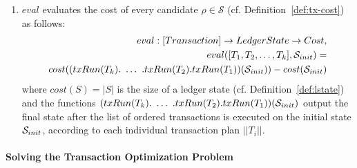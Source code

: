 \begin{definition}
\begin{enumerate}
        \item $eval$ evaluates the cost of every candidate $\rho \in
            \mathcal{S}$ (cf. Definition~\ref{def:tx-cost}) as follows:
            \begin{align*}
                eval : [Transaction] \rightarrow LedgerState \rightarrow Cost,
                \\
                eval([T_1, T_2, \dots, T_k], \ledgerState_{init}) = \\
                cost((txRun(T_k).\ \dots\ .txRun(T_2).txRun(T_1))(\ledgerState_{init})) - cost(\ledgerState_{init})\\
            \end{align*}
            where $cost(S) = |S|$ is the size of a ledger state (cf.
            Definition~\ref{def:lstate}) and the functions $(txRun(T_k).\ \dots\
            .txRun(T_2).txRun(T_1))(\mathcal{S}_{init})$ output the final
            state after the list of ordered transactions is executed on the
            initial state $\mathcal{S}_{init}$, according to each individual
            transaction plan $||T_i||$.
    \end{enumerate}
\end{definition}

\paragraph{Solving the Transaction Optimization Problem}

